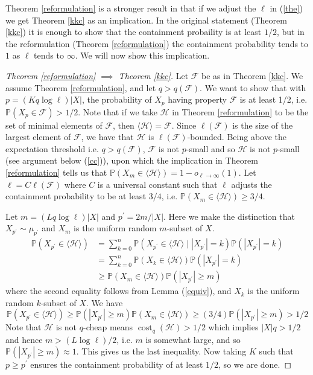 \documentclass[12pt,oneside,reqno]{amsart}
\theoremstyle{definition}
\numberwithin{equation}{theorem}
\newcommand{\PP}{{\mathbb P}}%
\newcommand{\cF}{{\mathcal F}}
\newcommand{\cH}{{\mathcal H}}
\begin{document}
Theorem \ref{reformulation} is a stronger result in that if we adjust the $\ell$ in (\ref{the}) we get Theorem \ref{kkc} as an implication. In the original statement (Theorem \ref{kkc}) it is enough to show that the containment probaility is at least $1/2$, but in the reformulation (Theorem \ref{reformulation}) the containment probability tends to $1$ as $\ell$ tends to $\infty$. We will now show this implication.
\begin{proof}[Theorem \ref{reformulation} $\implies$ Theorem \ref{kkc}]
Let $\cF$ be as in Theorem \ref{kkc}. We assume Theorem \ref{reformulation}, and let $q > q(\cF)$. We want to show that with $p = (Kq\log{\ell})|X|$, the probability of $X_{p}$ having property $\cF$ is at least 1/2, i.e. $\PP(X_{p} \in \cF) > 1/2.$
Note that if we take $\cH$ in Theorem \ref{reformulation} to be the set of minimal elements of $\cF$, then $\langle \cH \rangle = \cF$. Since $\ell(\cF)$ is the size of the largest element of $\cF$, we have that $\cH$ is $\ell(\cF)$-bounded. Being above the expectation threshold i.e. $q> q(\cF)$, $\cF$ is not $p$-small and so $\cH$ is not $p$-small (see argument below (\ref{cc})), upon which the implication in Theorem \ref{reformulation} tells us that $\PP\left(X_{ m} \in \langle \cH \rangle \right) = 1-o_{\ell \rightarrow \infty}(1)$. Let $\ell = C\ell(\cF)$ where $C$ is a universal constant such that $\ell$ adjusts the containment probability to be at least $3/4$, i.e. $\PP\left(X_{ m} \in \langle \cH \rangle \right) \geq 3/4$.

Let $m=(L q \log \ell)|X|$ and $p^{\prime}=2 m /|X|$. Here we make the distinction that $X_{p^{\prime}} \sim \mu_{p^{\prime}}$ and $X_m$ is the uniform random $m$-subset of $X$.
$$
\begin{aligned}
\mathbb{P}\left(X_{p^{\prime}} \in\langle\mathcal{H}\rangle\right) & =\sum_{k=0}^n \mathbb{P}\left(X_{p^{\prime}} \in\langle\mathcal{H}\rangle\mid| X_{p^{\prime}} |=k\right) \mathbb{P}\left(|X_{p^{\prime}}|=k\right) \\
&=\sum_{k=0}^n \mathbb{P}\left(X_k \in\langle\mathcal{H}\rangle\right) \mathbb{P}\left(|X_{p^{\prime}}|=k\right) \\
& \geq\mathbb{P}\left(X_m \in\langle\mathcal{H}\rangle\right) \mathbb{P}\left(|X_{p^{\prime}}| \geq m\right)
\end{aligned}
$$
where the second equality follows from Lemma (\ref{equiv}), and $X_k$ is the uniform random $k$-subset of $X$. We have 
\[
\mathbb{P}\left(X_{p^{\prime}} \in\langle\mathcal{H}\rangle\right) \geq \mathbb{P}\left(\left|X_{p^{\prime}}\right| \geq m\right) \mathbb{P}\left(X_{m} \in\langle\mathcal{H}\rangle\right) \geq(3 / 4) \mathbb{P}\left(\left|X_{p^{\prime}}\right| \geq m\right)>1 / 2
\]
Note that $\cH$ is not $q$-cheap means $\operatorname{cost}_q(\cH)>1 / 2$ which implies $|X| q>1 / 2$ and hence $m>(L \log{\ell}) / 2$, i.e. $m$ is somewhat large, and so $\mathbb{P}\left(|X_{p^{\prime}}| \geq m\right) \approx 1$. This gives us the last inequality. Now taking $K$ such that $p\geq p^{\prime}$ ensures the containment probability of at least $1/2$, so we are done. 
\end{proof}
\end{document}

